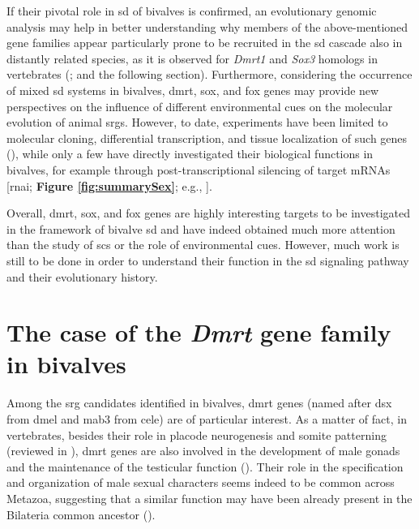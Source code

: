 \documentclass[../main.tex]{subfiles}
\begin{document}
If their pivotal role in \gls{sd} of bivalves is confirmed, an evolutionary genomic analysis may help in better understanding why members of the above-mentioned gene families appear particularly prone to be recruited in the \gls{sd} cascade also in distantly related species, as it is observed for \textit{Dmrt1} and \textit{Sox3} homologs in vertebrates (\textbf{\cite{marshall2010homologies,bachtrog2014sex}}; and the following section). Furthermore, considering the occurrence of mixed \gls{sd} systems in bivalves, \gls{dmrt}, \gls{sox}, and \gls{fox} genes may provide new perspectives on the influence of different environmental cues on the molecular evolution of animal \glspl{srg}. However, to date, experiments have been limited to molecular cloning, differential transcription, and tissue localization of such genes (\textbf{\cite{liang2019sox2,sun2022examination}}), while only a few have directly investigated their biological functions in bivalves, for example through post-transcriptional silencing of target mRNAs [\gls{rnai}; \textbf{Figure \ref{fig:summarySex}}; e.g., \textbf{\cite{liang2019sox2,wang2020identification,sun2022examination}}].

Overall, \gls{dmrt}, \gls{sox}, and \gls{fox} genes are highly interesting targets to be investigated in the framework of bivalve \gls{sd} and have indeed obtained much more attention than the study of \glspl{sc} or the role of environmental cues. However, much work is still to be done in order to understand their function in the \gls{sd} signaling pathway and their evolutionary history.

\section{The case of the \textit{Dmrt} gene family in bivalves}

Among the \gls{srg} candidates identified in bivalves, \gls{dmrt} genes (named after \gls{dsx} from \gls{dmel} and \gls{mab3} from \gls{cele}) are of particular interest. As a matter of fact, in vertebrates, besides their role in placode neurogenesis and somite patterning (reviewed in \textbf{\cite{mawaribuchi2019independent}}), \gls{dmrt} genes are also involved in the development of male gonads and the maintenance of the testicular function (\textbf{\cite{sun2022examination}}). Their role in the specification and organization of male sexual characters seems indeed to be common across Metazoa, suggesting that a similar function may have been already present in the Bilateria common ancestor (\textbf{\cite{kopp2012dmrt, beukeboom2014evolution}}).
\end{document}
